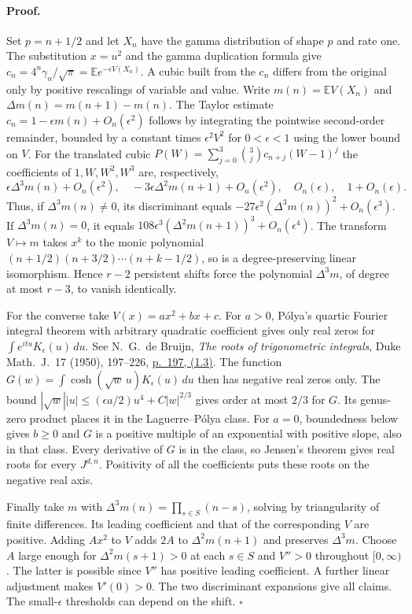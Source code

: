\paragraph{Proof.}
Set $p=n+1/2$ and let $X_n$ have the gamma distribution of shape $p$
and rate one. The substitution $x=u^2$ and the gamma duplication
formula give $c_n=4^n\gamma_n/\sqrt\pi=\mathbb E e^{-\epsilon V(X_n)}$.
A cubic built from the $c_n$ differs from the original only by positive
rescalings of variable and value. Write $m(n)=\mathbb EV(X_n)$ and
$\Delta m(n)=m(n+1)-m(n)$. The Taylor estimate
$c_n=1-\epsilon m(n)+O_n(\epsilon^2)$ follows by integrating the
pointwise second-order remainder, bounded by a constant times
$\epsilon^2 V^2$ for $0<\epsilon<1$ using the lower bound on $V$.
For the translated cubic $P(W)=\sum_{j=0}^3\binom{3}{j}c_{n+j}(W-1)^j$
the coefficients of $1,W,W^2,W^3$ are, respectively,
\[
 \epsilon\Delta^3m(n)+O_n(\epsilon^2),\quad
 -3\epsilon\Delta^2m(n+1)+O_n(\epsilon^2),\quad
 O_n(\epsilon),\quad 1+O_n(\epsilon).
\]
Thus, if $\Delta^3m(n)\ne0$, its discriminant equals
$-27\epsilon^2(\Delta^3m(n))^2+O_n(\epsilon^3)$.
If $\Delta^3m(n)=0$, it equals
$108\epsilon^3(\Delta^2m(n+1))^3+O_n(\epsilon^4)$.
The transform $V\mapsto m$ takes $x^k$ to the monic polynomial
$(n+1/2)(n+3/2)\cdots(n+k-1/2)$, so is a degree-preserving
linear isomorphism. Hence $r-2$ persistent shifts force the polynomial
$\Delta^3m$, of degree at most $r-3$, to vanish identically.

For the converse take $V(x)=ax^2+bx+c$. For $a>0$, P\'olya's quartic
Fourier integral theorem with arbitrary quadratic coefficient gives only real
zeros for $\int e^{itu}K_\epsilon(u)\,du$.
See N.~G.~de Bruijn, \emph{The roots of trigonometric integrals},
Duke Math.~J.~17 (1950), 197--226,
\href{https://repository.tudelft.nl/file/File_524a4d3c-0858-4c55-b425-8c8ce1fb89da}{p.~197, (1.3)}.
The function $G(w)=\int\cosh(\sqrt w\,u)K_\epsilon(u)\,du$ then
has negative real zeros only. The bound
$|\sqrt w||u|\le (\epsilon a/2)u^4+C|w|^{2/3}$ gives order
at most $2/3$ for $G$. Its genus-zero product places it in the
Laguerre--P\'olya class. For $a=0$, boundedness below gives $b\ge0$
and $G$ is a positive multiple of an exponential with positive slope,
also in that class. Every derivative of $G$ is in the class, so Jensen's
theorem gives real roots for every $J^{d,n}$. Positivity of all the
coefficients puts these roots on the negative real axis.

Finally take $m$ with $\Delta^3m(n)=\prod_{s\in S}(n-s)$, solving by
triangularity of finite differences. Its leading coefficient and that of
the corresponding $V$ are positive. Adding $A x^2$ to $V$ adds $2A$ to
$\Delta^2m(n+1)$ and preserves $\Delta^3m$. Choose $A$ large enough for
$\Delta^2m(s+1)>0$ at each $s\in S$ and $V''>0$ throughout $[0,\infty)$.
The latter is possible since $V''$ has positive leading coefficient.
A further linear adjustment makes $V'(0)>0$. The two discriminant expansions
give all claims. The small-$\epsilon$ thresholds can depend on the shift.
\hfill$\square$

